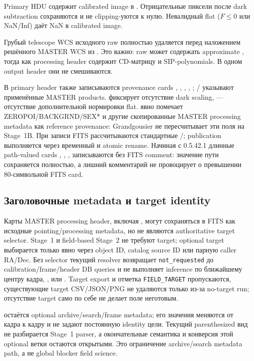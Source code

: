 Primary HDU содержит calibrated image в . Отрицательные пиксели после dark subtraction сохраняются и не clipping-уются к нулю. Невалидный flat ($F\le0$ или NaN/Inf) даёт NaN в calibrated image.

Грубый telescope WCS исходного raw полностью удаляется перед наложением решённого MASTER WCS из . Это важно: raw может содержать approximate , тогда как processing header содержит CD-матрицу и SIP-polynomials. В одном output header они не смешиваются.

В primary header также записываются provenance cards , , , , ; / указывают применённые MASTER products.  фиксирует отсутствие dark scaling,  --- отсутствие дополнительной нормировки flat.  явно помечает ZEROPOI/BACKGRND/SEX* и другие скопированные MASTER processing metadata как reference provenance: Grandgousier не пересчитывает эти поля на Stage~1B. При записи FITS рассчитываются стандартные /; publication выполняется через временный  и atomic rename. Начиная с 0.5.42.1 длинные path-valued cards , , ,  записываются без FITS comment: значение пути сохраняется полностью, а лишний комментарий не провоцирует  о превышении 80-символьной FITS card.

\subsection{Заголовочные metadata и target identity}

Карты MASTER processing header, включая , могут сохраняться в FITS как исходные pointing/processing metadata, но не являются authoritative target selector. Stage~1 и field-based Stage~2 не требуют target; optional target выбирается только явно через object ID, catalog source ID или парную caller RA/Dec. Без selector текущий resolver возвращает \texttt{not\_requested} до calibration/frame/header DB queries и не выполняет inference по ближайшему центру кадра, ,  или . Target export и отметка \texttt{FIELD\_TARGET} пропускаются, существующие target CSV/JSON/PNG не удаляются только из-за no-target run; отсутствие target само по себе не делает поле неготовым.

 остаётся optional archive/search/frame metadata; его значения меняются от кадра к кадру и не задают постоянную identity цели. Текущий parenthesized вид  не разбирается Stage~1 parser, а окончательные семантика и конверсия этой optional ветки остаются открытыми. Это ограничение archive/search metadata path, а не global blocker field science.

